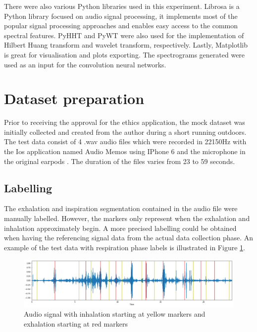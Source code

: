 There were also various Python libraries used in this experiment. Librosa is a Python library focused on audio signal processing, it implements most of the popular signal processing approaches and enables easy access to the common spectral features. PyHHT and PyWT were also used for the implementation of Hilbert Huang transform and wavelet transform, respectively. Lastly, Matplotlib is great for visualisation and plots exporting. The spectrograms generated were used as an input for the convolution neural networks.

\section{Dataset preparation}
Prior to receiving the approval for the ethics application, the mock dataset was initially collected and created from the author during a short running outdoors. The test data consist of 4 .wav audio files which were recorded in 22150Hz with the Ios application named Audio Memos using IPhone 6 and the microphone in the original earpods . The duration of the files varies from 23 to 59 seconds. 

\subsection{Labelling}
The exhalation and inspiration segmentation contained in the audio file were manually labelled. However, the markers only represent when the exhalation and inhalation approximately begin. A more precised labelling could be obtained when having the referencing signal data from the actual data collection phase. An example of the test data with respiration phase labels is illustrated in Figure \ref{fig:audio_waveform}.

\begin{figure}[h]
    \centerline{\includegraphics[scale=0.35]{figures/audio_waveform.png}}
    \caption{Audio signal with inhalation starting at yellow markers and exhalation starting at red markers }
    \label{fig:audio_waveform}
\end{figure}

\clearpage
